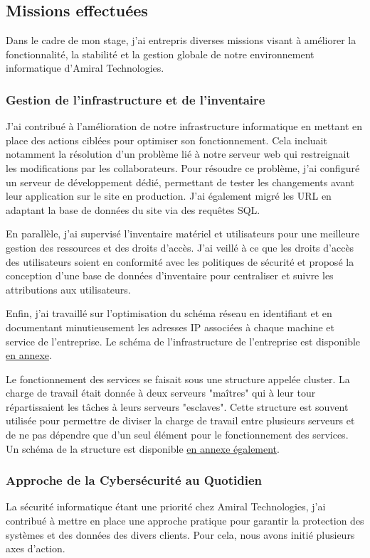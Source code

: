 \newpage

\subsection{Missions effectuées}
Dans le cadre de mon stage, j'ai entrepris diverses missions visant à améliorer la fonctionnalité, la stabilité et la gestion globale de notre environnement informatique d'Amiral Technologies.

\subsubsection{Gestion de l'infrastructure et de l'inventaire}
J'ai contribué à l'amélioration de notre infrastructure informatique en mettant en place des actions ciblées pour optimiser son fonctionnement.
Cela incluait notamment la résolution d'un problème lié à notre serveur web qui restreignait les modifications par les collaborateurs.
Pour résoudre ce problème, j'ai configuré un serveur de développement dédié, permettant de tester les changements avant leur application sur le site en production.
J'ai également migré les URL en adaptant la base de données du site via des requêtes SQL.

En parallèle, j'ai supervisé l'inventaire matériel et utilisateurs pour une meilleure gestion des ressources et des droits d'accès.
J'ai veillé à ce que les droits d'accès des utilisateurs soient en conformité avec les politiques de sécurité et proposé la conception d'une base de données d'inventaire pour centraliser et suivre les attributions aux utilisateurs.

Enfin, j'ai travaillé sur l'optimisation du schéma réseau en identifiant et en documentant minutieusement les adresses IP associées à chaque machine et service de l'entreprise.
Le schéma de l'infrastructure de l'entreprise est disponible \hyperref[infra]{en annexe}.

Le fonctionnement des services se faisait sous une structure appelée cluster.
La charge de travail était donnée à deux serveurs "maîtres" qui à leur tour répartissaient les tâches à leurs serveurs "esclaves".
Cette structure est souvent utilisée pour permettre de diviser la charge de travail entre plusieurs serveurs et de ne pas dépendre que d'un seul élément pour le fonctionnement des services.
Un schéma de la structure est disponible \hyperref[balancer]{en annexe également}.

\subsubsection{Approche de la Cybersécurité au Quotidien}
La sécurité informatique étant une priorité chez Amiral Technologies, j'ai contribué à mettre en place une approche pratique pour garantir la protection des systèmes et des données des divers clients.
Pour cela, nous avons initié plusieurs axes d'action.

